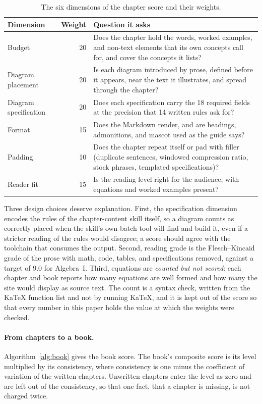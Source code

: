 \begin{table}[htbp]
\centering
\small
\begin{tabularx}{\textwidth}{@{}lrX@{}}
\toprule
\textbf{Dimension} & \textbf{Weight} & \textbf{Question it asks} \\
\midrule
Budget & 20 & Does the chapter hold the words, worked examples, and non-text elements that its own concepts call for, and cover the concepts it lists? \\
Diagram placement & 20 & Is each diagram introduced by prose, defined before it appears, near the text it illustrates, and spread through the chapter? \\
Diagram specification & 20 & Does each specification carry the 18 required fields at the precision that 14 written rules ask for? \\
Format & 15 & Does the Markdown render, and are headings, admonitions, and mascot used as the guide says? \\
Padding & 10 & Does the chapter repeat itself or pad with filler (duplicate sentences, windowed compression ratio, stock phrases, templated specifications)? \\
Reader fit & 15 & Is the reading level right for the audience, with equations and worked examples present? \\
\bottomrule
\end{tabularx}
\caption{The six dimensions of the chapter score and their weights.}
\label{tab:dimensions}
\end{table}

Three design choices deserve explanation. First, the specification dimension encodes the rules of the chapter-content skill itself, so a diagram counts as correctly placed when the skill's own batch tool will find and build it, even if a stricter reading of the rules would disagree; a score should agree with the toolchain that consumes the output. Second, reading grade is the Flesch--Kincaid grade \cite{kincaid1975} of the prose with math, code, tables, and specifications removed, against a target of 9.0 for Algebra~I. Third, equations are \textit{counted but not scored}: each chapter and book reports how many equations are well formed and how many the site would display as source text. The count is a syntax check, written from the KaTeX function list and not by running KaTeX, and it is kept out of the score so that every number in this paper holds the value at which the weights were checked.

\paragraph{From chapters to a book.}
Algorithm~\ref{alg:book} gives the book score. The book's composite score is its level multiplied by its consistency, where consistency is one minus the coefficient of variation of the written chapters. Unwritten chapters enter the level as zero and are left out of the consistency, so that one fact, that a chapter is missing, is not charged twice.

